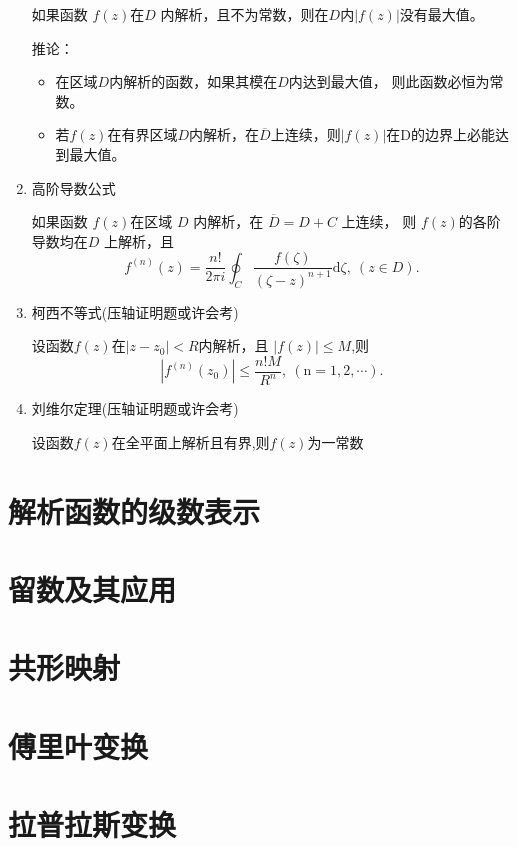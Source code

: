 \documentclass[a4paper,11pt,UTF8]{article}
\begin{document}
\begin{enumerate}
	如果函数 $f(z)$在$D$ 内解析，且不为常数，则在$D$内$\left|f(z)\right|$没有最大值。
	
	推论：
	\begin{itemize}
		\item 在区域$D$内解析的函数，如果其模在$D$内达到最大值， 则此函数必恒为常数。
		\item 若$f(z)$在有界区域$D$内解析，在$\overline{D}$上连续，则$|f(z)|$在D的边界上必能达到最大值。
	\end{itemize}
	\item 高阶导数公式
	
	如果函数 $f(z)$在区域 $D$ 内解析，在 $\overline{D}=D+C$ 上连续， 则 $f(z)$的各阶导数均在$D$ 上解析，且
	$$
	f^{(n)}(z)=\frac{n!}{2\pi i}\oint_C\frac{f(\zeta)}{\left(\zeta-z\right)^{n+1}}\mathrm{d}\zeta,\mathrm{~}(z\in D).
	$$
	\item 柯西不等式(压轴证明题或许会考)
	
	设函数$f(z)$在$|z-z_0|<R$内解析，且 $|f(z)|\leq M$,则
	$$
	|f^{(n)}(z_0)|\leq\frac{n!M}{R^n},\mathrm{~(n=1,2,\cdots)}.
	$$
	
	\item 刘维尔定理(压轴证明题或许会考)
	
	设函数$f(z)$在全平面上解析且有界,则$f(z)$为一常数
	
	
\end{enumerate}

\section{解析函数的级数表示}
\section{留数及其应用}
\section{共形映射}
\section{傅里叶变换}
\section{拉普拉斯变换}
\end{document}
